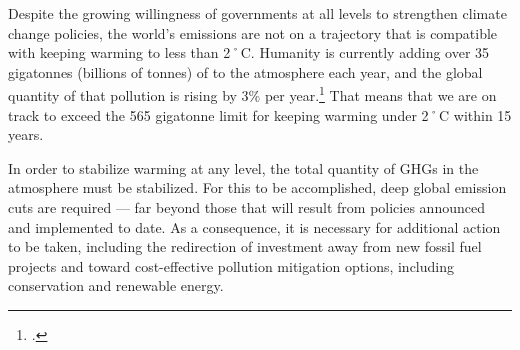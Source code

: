 Despite the growing willingness of governments at all levels to strengthen climate change policies, the world's emissions are not on a trajectory that is compatible with keeping warming to less than 2˚C.
Humanity is currently adding over 35 gigatonnes (billions of tonnes) of  to the atmosphere each year, and the global quantity of that pollution is rising by 3\% per year.\footcite[][p. 26]{IPCCar4_syr}
That means that we are on track to exceed the 565 gigatonne limit for keeping warming under 2˚C within 15 years.



In order to stabilize warming at any level, the total quantity of GHGs in the atmosphere must be stabilized.
For this to be accomplished, deep global emission cuts are required --- far beyond those that will result from policies announced and implemented to date.
As a consequence, it is necessary for additional action to be taken, including the redirection of investment away from new fossil fuel projects and toward cost-effective pollution mitigation options, including conservation and renewable energy.



